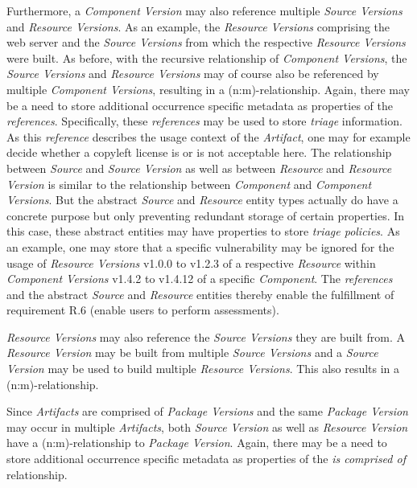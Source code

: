 Furthermore, a \emph{Component Version} may also reference multiple \emph{Source Versions} and \emph{Resource Versions}. As an example, the \emph{Resource Versions} comprising the web server and the \emph{Source Versions} from which the respective \emph{Resource Versions} were built. As before, with the recursive relationship of \emph{Component Versions}, the \emph{Source Versions} and \emph{Resource Versions} may of course also be referenced by multiple \emph{Component Versions}, resulting in a (n:m)-relationship. Again, there may be a need to store additional occurrence specific metadata as properties of the \emph{references}. Specifically, these \emph{references} may be used to store \emph{triage} information. As this \emph{reference} describes the usage context of the \emph{Artifact}, one may for example decide whether a copyleft license is or is not acceptable here. The relationship between \emph{Source} and \emph{Source Version} as well as between \emph{Resource} and \emph{Resource Version} is similar to the relationship between \emph{Component} and \emph{Component Versions}. But the abstract \emph{Source} and \emph{Resource} entity types actually do have a concrete purpose but only preventing redundant storage of certain properties. In this case, these abstract entities may have properties to store \emph{triage policies}. As an example, one may store that a specific vulnerability may be ignored for the usage of \emph{Resource Versions} v1.0.0 to v1.2.3 of a respective \emph{Resource} within \emph{Component Versions} v1.4.2 to v1.4.12 of a specific \emph{Component}. The \emph{references} and the abstract \emph{Source} and \emph{Resource} entities thereby enable the fulfillment of requirement R.6 (enable users to perform assessments).\par 
\emph{Resource Versions} may also reference the \emph{Source Versions} they are built from. A \emph{Resource Version} may be built from multiple \emph{Source Versions} and a \emph{Source Version} may be used to build multiple \emph{Resource Versions}. This also results in a (n:m)-relationship.\par
Since \emph{Artifacts} are comprised of \emph{Package Versions} and the same \emph{Package Version} may occur in multiple \emph{Artifacts}, both \emph{Source Version} as well as \emph{Resource Version} have a (n:m)-relationship to \emph{Package Version}. Again, there may be a need to store additional occurrence specific metadata as properties of the \emph{is comprised of} relationship.\par
